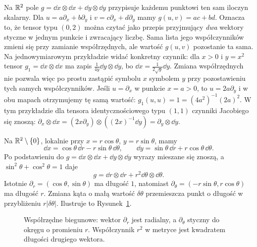 \begin{przyklad}
Na $\mathbb{R}^2$ pole
$g=\dd x\otimes\dd x+\dd y\otimes\dd y$
przypisuje każdemu punktowi ten sam iloczyn skalarny.
Dla $u=a\partial_x+b\partial_y$ i
$v=c\partial_x+d\partial_y$ mamy
$g(u,v)=ac+bd$. Oznacza to, że tensor typu $(0,2)$
można czytać jako przepis przyjmujący \emph{dwa}
wektory styczne w jednym punkcie i zwracający liczbę.
Sama lista jego współczynników zmieni się przy zamianie
współrzędnych, ale wartość $g(u,v)$ pozostanie ta sama.
Na jednowymiarowym przykładzie widać konkretny czynnik:
dla $x>0$ i $y=x^2$ tensor $g_1=\dd x\otimes\dd x$ ma zapis
$\frac1{4y}\dd y\otimes\dd y$, bo
$\dd x=\frac1{2\sqrt y}\dd y$. Zmiana współrzędnych nie
pozwala więc po prostu zastąpić symbolu $x$ symbolem $y$
przy pozostawieniu tych samych współczynników.
Jeśli $u=\partial_x$ w punkcie $x=a>0$, to
$u=2a\partial_y$ i w obu mapach otrzymujemy tę samą
wartość: $g_1(u,u)=1=(4a^2)^{-1}(2a)^2$.
W tym przykładzie dla tensora identycznościowego typu $(1,1)$
czynniki Jacobiego się znoszą:
$\partial_x\otimes\dd x
 =(2x\partial_y)\otimes((2x)^{-1}\dd y)
 =\partial_y\otimes\dd y$.
\end{przyklad}

\begin{przyklad}
Na $\mathbb{R}^2\setminus\{0\}$, lokalnie przy
$x=r\cos\theta$, $y=r\sin\theta$, mamy
\[
 \dd x=\cos\theta\,\dd r-r\sin\theta\,\dd\theta,
 \qquad
 \dd y=\sin\theta\,\dd r+r\cos\theta\,\dd\theta.
\]
Po podstawieniu do $g=\dd x\otimes\dd x+
\dd y\otimes\dd y$ wyrazy mieszane się znoszą, a
$\sin^2\theta+\cos^2\theta=1$ daje
\[
 g=\dd r\otimes\dd r+r^2\dd\theta\otimes\dd\theta.
\]
Istotnie $\partial_r=(\cos\theta,\sin\theta)$ ma
długość $1$, natomiast
$\partial_\theta=(-r\sin\theta,r\cos\theta)$ ma
długość $r$. Zmiana kąta o małą wartość $\delta\theta$
przemieszcza punkt o długość w przybliżeniu $r|\delta\theta|$.
Ilustruje to Rysunek~\ref{fig:tensor-biegunowe}.
\end{przyklad}

\begin{figure}[H]
\centering
{}
\caption{Współrzędne biegunowe: wektor $\partial_r$ jest radialny,
a $\partial_\theta$ styczny do okręgu o promieniu $r$.
Współczynnik $r^2$ w metryce jest kwadratem długości drugiego wektora.}
\label{fig:tensor-biegunowe}
\end{figure}

